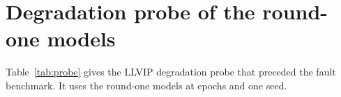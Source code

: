 \begin{table}[t]
\centering
\caption{M3FD average precision in the finer size bands, percent, per seed and as mean and sample standard deviation.}
\label{tab:bands}
{\footnotesize\setlength{\tabcolsep}{3.5pt}
}
\end{table}

\section{Degradation probe of the round-one models}
\label{app:probe}
Table~\ref{tab:probe} gives the LLVIP degradation probe that preceded the fault benchmark. It uses the round-one models at \cfgEpochsPilot{} epochs and one seed.

